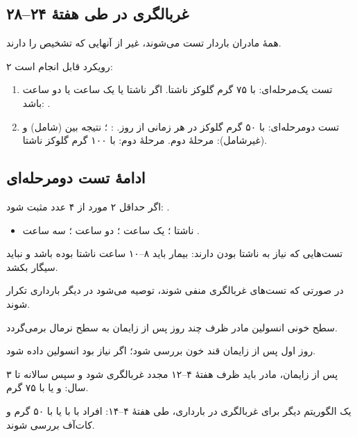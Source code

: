 \documentclass[12pt,a4paper]{article}
\begin{document}
\subsection*{غربالگری  در طی هفتهٔ ۲۴--۲۸}
همهٔ مادران باردار تست می‌شوند، غیر از آنهایی که تشخیص  را دارند.

۲ رویکرد قابل انجام است:
\begin{enumerate}
\item تست یک‌مرحله‌ای:  با ۷۵ گرم گلوکز ناشتا.
اگر ناشتا  یا یک ساعت  یا دو ساعت  باشد: .
\item تست دو‌مرحله‌ای:  با ۵۰ گرم گلوکز در هر زمانی از روز.
: ؛ نتیجه بین  (شامل) و  (غیرشامل): مرحلهٔ دوم.
مرحلهٔ دوم:  با ۱۰۰ گرم گلوکز ناشتا.
\end{enumerate}

\subsection*{ادامهٔ تست دو‌مرحله‌ای}
اگر حداقل ۲ مورد از ۴ عدد مثبت شود: .
\begin{itemize}
\item ناشتا ؛ یک ساعت ؛ دو ساعت ؛ سه ساعت .
\end{itemize}
تست‌هایی که نیاز به ناشتا بودن دارند: بیمار باید ۸--۱۰ ساعت ناشتا بوده باشد و نباید سیگار بکشد.

در صورتی که تست‌های غربالگری  منفی شوند، توصیه می‌شود در دیگر بارداری تکرار شوند.

سطح خونی انسولین مادر ظرف چند روز پس از زایمان به سطح نرمال برمی‌گردد.

روز اول پس از زایمان قند خون بررسی شود؛ اگر نیاز بود انسولین داده شود.

پس از زایمان، مادر باید ظرف هفتهٔ ۴--۱۲ مجدد غربالگری شود و سپس سالانه تا ۳ سال:  و یا  با ۷۵ گرم.

یک الگوریتم دیگر برای غربالگری  در بارداری، طی هفتهٔ ۴--۱۴: افراد با  با  یا  با ۵۰ گرم و کات‌آف  بررسی شوند.
\end{document}
